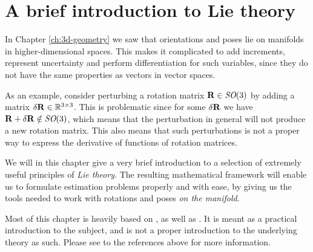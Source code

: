 \chapter{A brief introduction to Lie theory} \label{sec:Lie-theory}
In Chapter \ref{ch:3d-geometry} we saw that orientations and poses lie on manifolds in higher-dimensional spaces.
This makes it complicated to add increments, represent uncertainty and perform differentiation for such variables, since they do not have the same properties as vectors in vector spaces.

As an example, consider perturbing a rotation matrix ${\boldsymbol{\mathbf{R}}} \in \textit{SO}(3)$ by adding a matrix $\delta {\boldsymbol{\mathbf{R}}} \in {\mathbb R}^{3 \times 3}$.
This is problematic since for some $\delta {\boldsymbol{\mathbf{R}}}$ we have ${\boldsymbol{\mathbf{R}}} + \delta {\boldsymbol{\mathbf{R}}} \notin \textit{SO}(3)$, which means that the perturbation in general will not produce a new rotation matrix.
This also means that such perturbations is not a proper way to express the derivative of functions of rotation matrices.

We will in this chapter give a very brief introduction to a selection of extremely useful principles of \emph{Lie theory}.
The resulting mathematical framework will enable us to formulate estimation problems properly and with ease, by giving us the tools needed to work with rotations and poses \emph{on the manifold}.

Most of this chapter is heavily based on \cite{SolaARobotics}, as well as  \cite{Eade2013LieTransformations, barfoot2017state}.
It is meant as a practical introduction to the subject, and is not a proper introduction to the underlying theory as such.
Please see to the references above for more information.



